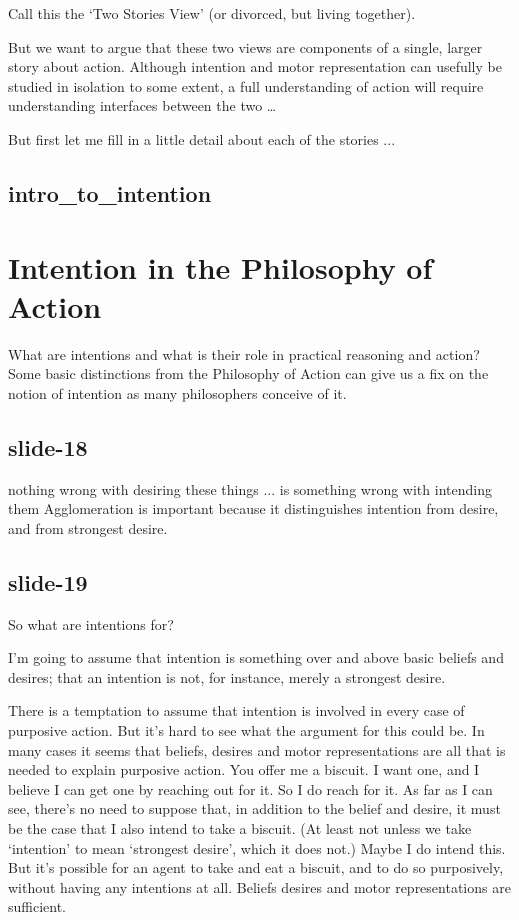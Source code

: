 \documentclass[12pt,\papersize]{extarticle}
\begin{document}
Call this the ‘Two Stories View’ (or divorced, but living together).

But we want to argue that these two views are components of a single, larger story about action.
Although intention and motor representation can usefully be studied in isolation
to some extent, a full understanding of action will require understanding
interfaces between the two …

But first let me fill in a little detail about each of the stories ...

\subsection{intro\_to\_intention}


\section{Intention in the Philosophy of Action}

What are intentions and what is their role in practical reasoning and action? Some basic
distinctions from the Philosophy of Action can give us a fix on the notion of intention as
many philosophers conceive of it.

\subsection{slide-18}
nothing wrong with desiring these things ... is something wrong with intending them
Agglomeration is important because it distinguishes intention from desire, and from strongest desire.

\subsection{slide-19}
So what are intentions for?

I’m going to assume that intention is something over and above basic beliefs and desires; that an
intention is not, for instance, merely a strongest desire.

There is a temptation to assume that intention is involved in every case of purposive action.
But it’s hard to see what the argument for this could be.
In many cases it seems that beliefs, desires and motor representations are all that is needed to explain purposive action.
You offer me a biscuit.  I want one, and I believe I can get one by reaching out for it.  So I do reach for it.  As far as I can see, there’s no need to suppose that, in addition to the belief and desire, it must be the case that I also intend to take a biscuit.
(At least not unless we take ‘intention’ to mean ‘strongest desire’, which it does not.)
Maybe I do intend this.
But it’s possible for an agent to take and eat a biscuit, and to do so purposively, without having any intentions at all.
Beliefs desires and motor representations are sufficient.
\end{document}
